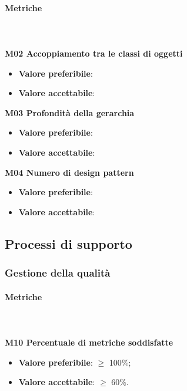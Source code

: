 			\paragraph{Metriche} \mbox{} \\ \\
				\textbf{M02 Accoppiamento tra le classi di oggetti} 
				\begin{itemize}
					\item \textbf{Valore preferibile}:
					\item \textbf{Valore accettabile}: 
				\end{itemize}
				\textbf{M03 Profondità della gerarchia} 
				\begin{itemize}
					\item \textbf{Valore preferibile}:
					\item \textbf{Valore accettabile}: 
				\end{itemize}			
				\textbf{M04 Numero di design pattern} 
				\begin{itemize}
					\item \textbf{Valore preferibile}:
					\item \textbf{Valore accettabile}: 
				\end{itemize}
	
			
	\subsection{Processi di supporto}		
		\subsubsection{Gestione della qualità}
			\paragraph{Metriche} \mbox{} \\ \\
				\textbf{M10 Percentuale di metriche soddisfatte}
				\begin{itemize}
					\item \textbf{Valore preferibile}: $\ge$ 100\%;
					\item \textbf{Valore accettabile}: $\ge$ 60\%.
				\end{itemize}


		  
			
				

